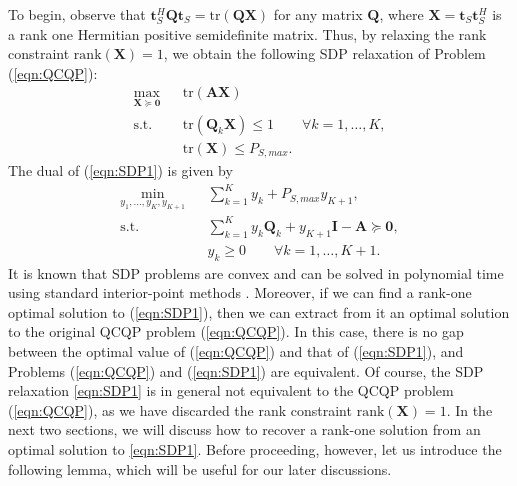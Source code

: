 \documentclass[twocolumn,10pt]{IEEEtran}
\theoremstyle{plain} \newtheorem{theorem}{Theorem}
\theoremstyle{plain} \newtheorem{proposition}{Proposition}
\theoremstyle{plain} \newtheorem{corollary}{Corollary}
\theoremstyle{remark} \newtheorem{remark}{Remark}
\theoremstyle{remark} \newtheorem{lemma}{Lemma}
\theoremstyle{plain} \newtheorem{definition}{Definition}
\theoremstyle{plain} \newtheorem{assumption}{Assumption}
\theoremstyle{plain} \newtheorem{fact}{Fact}
\begin{document}
To begin, observe that $\mathbf{t}_S^H\mathbf{Q}\mathbf{t}_S = \mathrm{tr}(\mathbf{Q}\mathbf{X})$ for any matrix $\mathbf{Q}$, where $\mathbf{X}=\mathbf{t}_S\mathbf{t}_S^H$ is a rank one Hermitian positive semidefinite matrix.  Thus, by relaxing the rank constraint $\mathrm{rank}(\mathbf{X})=1$, we obtain the following SDP relaxation of Problem (\ref{eqn:QCQP}):
\begin{subequations}\label{eqn:SDP1}
\begin{eqnarray}
\max_{\mathbf{X}\succeq\mathbf{0}}&& \mathrm{tr}(\mathbf{A}\mathbf{X})\\
\text{s.t. }&&\mathrm{tr}(\mathbf{Q}_k\mathbf{X}) \leq 1 \qquad\forall k=1,\ldots,K, \label{eqn:SDP-constraint1}\\
&&\mathrm{tr}(\mathbf{X}) \leq P_{S,max} \label{eqn:SDP-constraint2}.
\end{eqnarray}
\end{subequations}
The dual of (\ref{eqn:SDP1}) is given by
\begin{subequations}\label{eqn:SDP-dual}
\begin{eqnarray}
\min_{y_1,\ldots,y_K,y_{K+1}}&& \sum_{k=1}^{K}y_k+P_{S,max}y_{K+1}, \\
\text{s.t. } && \sum_{k=1}^{K} y_k\mathbf{Q}_k+y_{K+1}\mathbf{I}-\mathbf{A}\succeq\mathbf{0}, \label{eqn:SDP-dual-constraint1}\\
&& y_k\geq0 \qquad\forall k=1,\ldots,K+1.
\end{eqnarray}
\end{subequations}
It is known that SDP problems are convex and can be solved in polynomial time using standard interior-point methods \cite{VB96}.  Moreover, if we can find a rank-one optimal solution to (\ref{eqn:SDP1}), then we can extract from it an optimal solution to the original QCQP problem (\ref{eqn:QCQP}).  In this case, there is no gap between the optimal value of (\ref{eqn:QCQP}) and that of (\ref{eqn:SDP1}), and Problems (\ref{eqn:QCQP}) and (\ref{eqn:SDP1}) are equivalent.  Of course, the SDP relaxation \eqref{eqn:SDP1} is in general not equivalent to the QCQP problem (\ref{eqn:QCQP}), as we have discarded the rank constraint $\mathrm{rank}(\mathbf{X})=1$.  In the next two sections, we will discuss how to recover a rank-one solution from an optimal solution to \eqref{eqn:SDP1}.  Before proceeding, however, let us introduce the following lemma, which will be useful for our later discussions.
\end{document}
